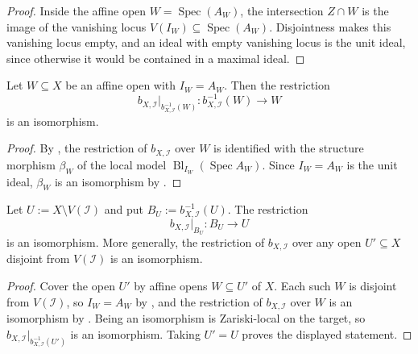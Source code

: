 \begin{proof}
  \leanok
  Inside the affine open $W=\operatorname{Spec}(A_W)$, the intersection
  $Z\cap W$ is the image of the vanishing locus
  $V(I_W)\subseteq\operatorname{Spec}(A_W)$.  Disjointness makes this
  vanishing locus empty, and an ideal with empty vanishing locus is the
  unit ideal, since otherwise it would be contained in a maximal ideal.
\end{proof}

\begin{lemma}
  \label{lemma:nagata-affine-blowup-complement}
  \leanok

  Let $W\subseteq X$ be an affine open with $I_W=A_W$.  Then the
  restriction
  \[
    b_{X,\mathcal I}|_{b_{X,\mathcal I}^{-1}(W)}\colon
      b_{X,\mathcal I}^{-1}(W)\longrightarrow W
  \]
  is an isomorphism.
\end{lemma}

\begin{proof}
  \leanok
  By , the restriction of
  $b_{X,\mathcal I}$ over $W$ is identified with the structure morphism
  $\beta_W$ of the local model
  $\operatorname{Bl}_{I_W}(\operatorname{Spec}A_W)$.  Since $I_W=A_W$ is
  the unit ideal, $\beta_W$ is an isomorphism by
  .
\end{proof}

\begin{theorem}
  \label{thm:nagata-global-blowup-complement}
  \leanok

  Let $U:=X\setminus V(\mathcal I)$ and put
  $B_U:=b_{X,\mathcal I}^{-1}(U)$.  The restriction
  \[
    b_{X,\mathcal I}|_{B_U}\colon B_U\longrightarrow U
  \]
  is an isomorphism.  More generally, the restriction of
  $b_{X,\mathcal I}$ over any open $U'\subseteq X$ disjoint from
  $V(\mathcal I)$ is an isomorphism.
\end{theorem}

\begin{proof}
  \leanok
  Cover the open $U'$ by affine opens $W\subseteq U'$ of $X$.  Each such
  $W$ is disjoint from $V(\mathcal I)$, so $I_W=A_W$ by
  , and the restriction of
  $b_{X,\mathcal I}$ over $W$ is an isomorphism by
  .  Being an isomorphism is
  Zariski-local on the target, so
  $b_{X,\mathcal I}|_{b_{X,\mathcal I}^{-1}(U')}$ is an isomorphism.
  Taking $U'=U$ proves the displayed statement.
\end{proof}

